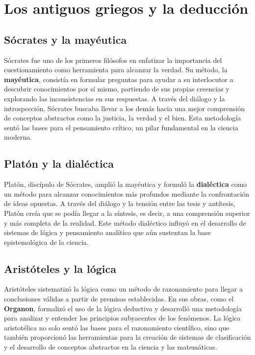 \documentclass[
  letterpaper,
  DIV=11,
  numbers=noendperiod]{scrreprt}
\begin{document}
\chapter{Los antiguos griegos y la
deducción}\label{los-antiguos-griegos-y-la-deducciuxf3n}

\section{Sócrates y la mayéutica}\label{suxf3crates-y-la-mayuxe9utica}

Sócrates fue uno de los primeros filósofos en enfatizar la importancia
del cuestionamiento como herramienta para alcanzar la verdad. Su método,
la \textbf{mayéutica}, consistía en formular preguntas para ayudar a su
interlocutor a descubrir conocimientos por sí mismo, partiendo de sus
propias creencias y explorando las inconsistencias en sus respuestas. A
través del diálogo y la introspección, Sócrates buscaba llevar a los
demás hacia una mejor comprensión de conceptos abstractos como la
justicia, la verdad y el bien. Esta metodología sentó las bases para el
pensamiento crítico, un pilar fundamental en la ciencia moderna.

\section{Platón y la dialéctica}\label{platuxf3n-y-la-dialuxe9ctica}

Platón, discípulo de Sócrates, amplió la mayéutica y formuló la
\textbf{dialéctica} como un método para alcanzar conocimientos más
profundos mediante la confrontación de ideas opuestas. A través del
diálogo y la tensión entre las tesis y antítesis, Platón creía que se
podía llegar a la síntesis, es decir, a una comprensión superior y más
completa de la realidad. Este método dialéctico influyó en el desarrollo
de sistemas de lógica y pensamiento analítico que aún sustentan la base
epistemológica de la ciencia.

\section{Aristóteles y la lógica}\label{aristuxf3teles-y-la-luxf3gica}

Aristóteles sistematizó la lógica como un método de razonamiento para
llegar a conclusiones válidas a partir de premisas establecidas. En sus
obras, como el \textbf{Organon}, formalizó el uso de la lógica deductiva
y desarrolló una metodología para analizar y entender los principios
subyacentes de los fenómenos. La lógica aristotélica no solo sentó las
bases para el razonamiento científico, sino que también proporcionó las
herramientas para la creación de sistemas de clasificación y el
desarrollo de conceptos abstractos en la ciencia y las matemáticas.
\end{document}
